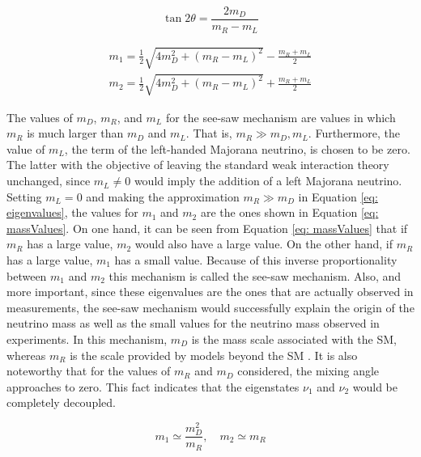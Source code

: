 \begin{equation}\label{eq: mixingAngle}
\tan 2\theta = \frac{2m_{D}}{m_{R}-m_{L}}
\end{equation}

\begin{equation}\label{eq: eigenvalues}
\begin{split}
m_{1} = \frac{1}{2}\sqrt{4m_{D}^{2} + \left(m_{R} - m_{L}\right)^{2}} - \frac{m_{R} + m_{L}}{2} \\
m_{2} = \frac{1}{2}\sqrt{4m_{D}^{2} + \left(m_{R} - m_{L}\right)^{2}} + \frac{m_{R} + m_{L}}{2}
\end{split}
\end{equation}

The values of $m_{D}$, $m_{R}$, and $m_{L}$ for the see-saw mechanism are values in which $m_{R}$ is much larger than $m_{D}$ and $m_{L}$. That is, $m_{R} \gg m_{D}, m_{L}$. Furthermore, the value of $m_{L}$, the term of the left-handed Majorana neutrino, is chosen to be zero. The latter with the objective of leaving the standard weak interaction theory unchanged, since $m_{L} \neq 0$ would imply the addition of a left Majorana neutrino. Setting $m_{L} = 0$ and making the approximation $m_{R} \gg m_{D}$ in Equation \ref{eq: eigenvalues}, the values for $m_{1}$ and $m_{2}$ are the ones shown in Equation \ref{eq: massValues}. On one hand, it can be seen from Equation \ref{eq: massValues} that if $m_{R}$ has a large value, $m_{2}$ would also have a large value. On the other hand, if $m_{R}$ has a large value, $m_{1}$ has a small value. Because of this inverse proportionality between $m_{1}$ and $m_{2}$ this mechanism is called the see-saw mechanism. Also, and more important, since these eigenvalues are the ones that are actually observed in measurements, the see-saw mechanism would successfully explain the origin of the neutrino mass as well as the small values for the neutrino mass observed in experiments. In this mechanism, $m_{D}$ is the mass scale associated with the SM, whereas $m_{R}$ is the scale provided by models beyond the SM \cite{NeutrinoMass}. It is also noteworthy that for the values of $m_{R}$ and $m_{D}$ considered, the mixing angle approaches to zero. This fact indicates that the eigenstates $\nu_{1}$ and $\nu_{2}$ would be completely decoupled.

\begin{equation}\label{eq: massValues}
m_{1} \simeq \frac{m_{D}^{2}}{m_{R}}, \quad m_{2} \simeq m_{R}
\end{equation}

